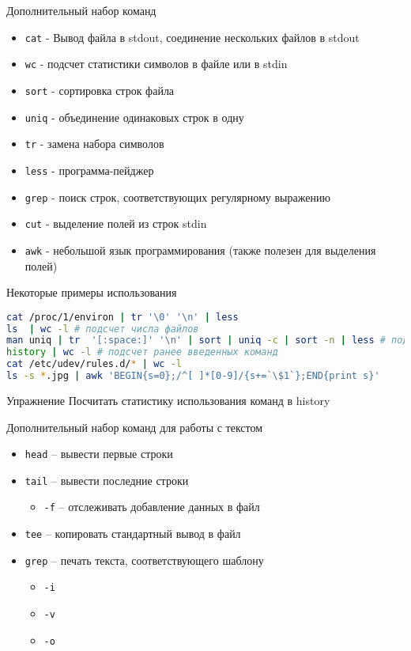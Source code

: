 \begin{frame}{Дополнительный набор команд}
  \begin{itemize}
    \item {\tt cat} - Вывод файла в stdout, соединение нескольких файлов в stdout
    \item {\tt wc} - подсчет статистики символов в файле или в stdin 
    \item {\tt sort} - сортировка строк файла
    \item {\tt uniq} - объединение одинаковых строк в одну
    \item {\tt tr} - замена набора символов
    \item {\tt less} - программа-пейджер
    \item {\tt grep} - поиск строк, соответствующих регулярному выражению
    \item {\tt cut} - выделение полей из строк stdin
    \item {\tt awk} - небольшой язык программирования (также полезен для выделения полей)
  \end{itemize}
\end{frame}


\begin{frame}[fragile]{Некоторые примеры использования}
\begin{lstlisting}[language=bash]
cat /proc/1/environ | tr '\0' '\n' | less
ls  | wc -l # подсчет числа файлов
man uniq | tr  '[:space:]' '\n' | sort | uniq -c | sort -n | less # подсчет количества слов в тексте man uniq
history | wc -l # подсчет ранее введенных команд
cat /etc/udev/rules.d/* | wc -l
ls -s *.jpg | awk 'BEGIN{s=0};/^[ ]*[0-9]/{s+=`\$1`};END{print s}' 
\end{lstlisting}
  \pause
  \begin{block}{Упражнение}
    Посчитать статистику использования команд в history
  \end{block}
\end{frame}

\begin{frame}{Дополнительный набор команд для работы с текстом}
	\begin{itemize}
	  \item {\tt head} -- вывести первые строки
	  \item {\tt tail} -- вывести последние строки
		\begin{itemize}
			\item {\tt -f} -- отслеживать добавление данных в файл 
		\end{itemize}
	  \item {\tt tee} -- копировать стандартный вывод в файл
	  \item {\tt grep} -- печать текста, соответствующего шаблону
		\begin{itemize}
			\item {\tt -i}	
			\item {\tt -v}
			\item {\tt -o}
		\end{itemize}
	\end{itemize}
\end{frame}

